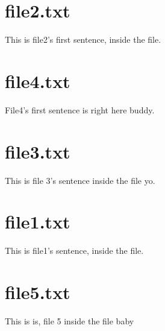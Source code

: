 \section{file2.txt}
This is file2's first sentence, inside the file.
\section{file4.txt}
File4's first sentence is right here buddy.
\section{file3.txt}
This is file 3's sentence inside the file yo.
\section{file1.txt}
This is file1's sentence, inside the file.
\section{file5.txt}
This is is, file 5 inside the file baby
